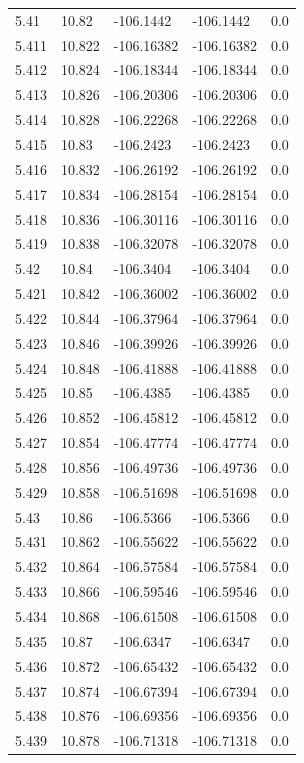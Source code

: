 \begin{tabular}{lllll}
5.41 & 10.82 & -106.1442 & -106.1442 & 0.0 \\
5.411 & 10.822 & -106.16382 & -106.16382 & 0.0 \\
5.412 & 10.824 & -106.18344 & -106.18344 & 0.0 \\
5.413 & 10.826 & -106.20306 & -106.20306 & 0.0 \\
5.414 & 10.828 & -106.22268 & -106.22268 & 0.0 \\
5.415 & 10.83 & -106.2423 & -106.2423 & 0.0 \\
5.416 & 10.832 & -106.26192 & -106.26192 & 0.0 \\
5.417 & 10.834 & -106.28154 & -106.28154 & 0.0 \\
5.418 & 10.836 & -106.30116 & -106.30116 & 0.0 \\
5.419 & 10.838 & -106.32078 & -106.32078 & 0.0 \\
5.42 & 10.84 & -106.3404 & -106.3404 & 0.0 \\
5.421 & 10.842 & -106.36002 & -106.36002 & 0.0 \\
5.422 & 10.844 & -106.37964 & -106.37964 & 0.0 \\
5.423 & 10.846 & -106.39926 & -106.39926 & 0.0 \\
5.424 & 10.848 & -106.41888 & -106.41888 & 0.0 \\
5.425 & 10.85 & -106.4385 & -106.4385 & 0.0 \\
5.426 & 10.852 & -106.45812 & -106.45812 & 0.0 \\
5.427 & 10.854 & -106.47774 & -106.47774 & 0.0 \\
5.428 & 10.856 & -106.49736 & -106.49736 & 0.0 \\
5.429 & 10.858 & -106.51698 & -106.51698 & 0.0 \\
5.43 & 10.86 & -106.5366 & -106.5366 & 0.0 \\
5.431 & 10.862 & -106.55622 & -106.55622 & 0.0 \\
5.432 & 10.864 & -106.57584 & -106.57584 & 0.0 \\
5.433 & 10.866 & -106.59546 & -106.59546 & 0.0 \\
5.434 & 10.868 & -106.61508 & -106.61508 & 0.0 \\
5.435 & 10.87 & -106.6347 & -106.6347 & 0.0 \\
5.436 & 10.872 & -106.65432 & -106.65432 & 0.0 \\
5.437 & 10.874 & -106.67394 & -106.67394 & 0.0 \\
5.438 & 10.876 & -106.69356 & -106.69356 & 0.0 \\
5.439 & 10.878 & -106.71318 & -106.71318 & 0.0 \\

\end{tabular}
